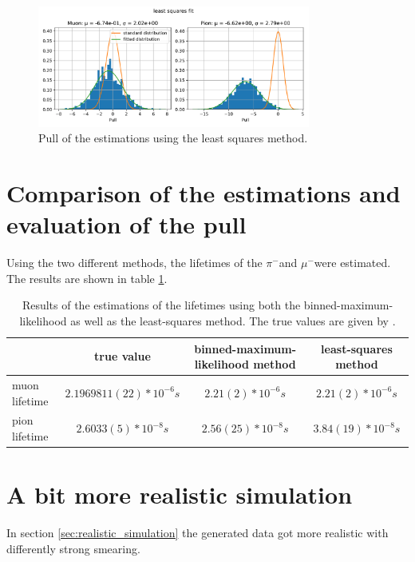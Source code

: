 \documentclass[11pt, a4paper, oneside]{book}
\newcommand\Plotwidth{0.8}
\newcommand{\pion}{$\pi^{-}$}
\newcommand{\muon}{$\mu^{-}$}
\begin{document}
\begin{figure}[H]
  \centering
  \includegraphics[width=\Plotwidth\textwidth]{images/estimators_pull_least_squares.pdf}
  \caption{Pull of the estimations using the least squares method.}
  \label{fig:pull_least_squares_method}
\end{figure}

\section{Comparison of the estimations and evaluation of the pull}
Using the two different methods, the lifetimes of the \pion and \muon were estimated. The results are shown in table \ref{tab:results}.

\begin{table}[H]
  \begin{tabular}{l|ccc}
                & true value & binned-maximum-likelihood method & least-squares method \\ \hline
  muon lifetime & $2.1969811(22)*10^{-6}\si{s}$ & $2.21(2)*10^{-6}\si{s}$ & $2.21(2)*10^{-6}\si{s}$ \\
  pion lifetime & $2.6033(5)*10^{-8}\si{s}$ & $2.56(25)*10^{-8}\si{s}$ & $3.84(19)*10^{-8}\si{s}$                    
  \end{tabular}
  \caption{Results of the estimations of the lifetimes using both the binned-maximum-likelihood as well as the least-squares method. The true values are given by \cite{ParticleDataGroup:2024cfk}.}
  \label{tab:results}
\end{table}


\section{A bit more realistic simulation}

In section \ref{sec:realistic_simulation} the generated data got more realistic with differently strong smearing.
\end{document}
